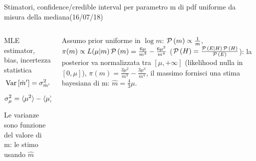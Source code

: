 \begin{wordonframe}{Stimatori, confidence/credible interval per parametro m di pdf uniforme da misura della mediana(16/07/18)}
	\begin{columns}[T]\begin{column}{0.5\textwidth}
			\begin{block}{MLE estimator, bias, incertezza statistica}
				\begin{align*}
				&\operatorname{Var}{[\hat{m}']}=\sigma^2_{\hat{m}'}=4\operatorname{Var}{\mu}=4\sigma_{\mu}^2\\
				&\sigma^2_{\mu}=\langle \mu^2 \rangle-\langle \mu \rangle^2=\frac{m^2}{20}
				\end{align*}
				Le varianze sono funzione del valore di m: le stimo usando $\hat{m}$
			\end{block}
		\end{column}\begin{column}{0.5\textwidth}
			\begin{block}{}
				Assumo prior uniforme in $\log{m}$: $\operatorname{\mathcal{P}}{(m)}\propto\frac{1}{m}$,  $\pi(m)\propto L(\mu|m)\operatorname{\mathcal{P}}{(m)}=\frac{6\mu}{m^3}-\frac{6\mu^2}{m^4}$ ($\operatorname{\mathcal{P}}{(H)}=\frac{\operatorname{\mathcal{P}}{(E|H)\operatorname{\mathcal{P}}{(H)}}}{\operatorname{\mathcal{P}}{(E)}}$): la posterior va normalizzata tra $[\mu,+\infty]$ (likelihood nulla  in $[0,\mu]$), $\pi(m)=\frac{3\mu^2}{m^3}-\frac{3\mu^3}{m^4}$, il massimo fornisci una stima bayesiana di m: $\hat{m}=\frac{4}{3}\mu$.
			\end{block}
	\end{column}\end{columns}
\end{wordonframe}

